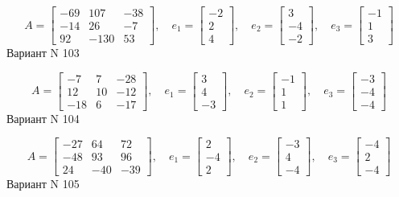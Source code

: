 \documentclass[11pt]{report}
\begin{document}
$$A = \left[\begin{matrix}-69 & 107 & -38\\-14 & 26 & -7\\92 & -130 & 53\end{matrix}\right],\quad e_1 = \left[\begin{matrix}-2\\2\\4\end{matrix}\right],\quad e_2 = \left[\begin{matrix}3\\-4\\-2\end{matrix}\right],\quad e_3 = \left[\begin{matrix}-1\\1\\3\end{matrix}\right]$$Вариант N 103

$$A = \left[\begin{matrix}-7 & 7 & -28\\12 & 10 & -12\\-18 & 6 & -17\end{matrix}\right],\quad e_1 = \left[\begin{matrix}3\\4\\-3\end{matrix}\right],\quad e_2 = \left[\begin{matrix}-1\\1\\1\end{matrix}\right],\quad e_3 = \left[\begin{matrix}-3\\-4\\-4\end{matrix}\right]$$Вариант N 104

$$A = \left[\begin{matrix}-27 & 64 & 72\\-48 & 93 & 96\\24 & -40 & -39\end{matrix}\right],\quad e_1 = \left[\begin{matrix}2\\-4\\2\end{matrix}\right],\quad e_2 = \left[\begin{matrix}-3\\4\\-4\end{matrix}\right],\quad e_3 = \left[\begin{matrix}-4\\2\\-4\end{matrix}\right]$$Вариант N 105
\end{document}
